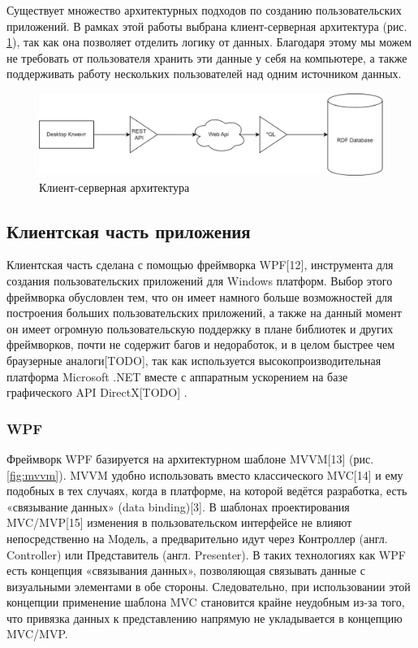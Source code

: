 \documentclass[12pt]{article}
\begin{document}
Существует множество архитектурных подходов по созданию пользовательских приложений. В рамках этой работы выбрана клиент-серверная архитектура (рис. \ref{fig:client_server_arch}), так как она позволяет отделить логику от данных. Благодаря этому мы можем не требовать от пользователя хранить эти данные у себя на компьютере, а также поддерживать работу нескольких пользователей над одним источником данных.

\begin{figure}[!ht]
    \centering
    \includegraphics[width=1\textwidth]{_images/architecture.png}
    \caption{Клиент-серверная архитектура}
    \label{fig:client_server_arch}
\end{figure}

\subsection{Клиентская часть приложения}
\qquad Клиентская часть сделана с помощью фреймворка WPF[12], инструмента для создания пользовательских приложений для Windows платформ. Выбор этого фреймворка обусловлен тем, что он имеет намного больше возможностей для построения больших пользовательских приложений, а также на данный момент он имеет огромную пользовательскую поддержку в плане библиотек и других фреймворков, почти не содержит багов и недоработок, и в целом быстрее чем браузерные аналоги[TODO], так как используется высокопроизводительная платформа Microsoft .NET вместе с аппаратным ускорением на базе графического API DirectX[TODO] .\par

\subsubsection{WPF}
\qquad Фреймворк WPF базируется на архитектурном шаблоне MVVM[13] (рис. \ref{fig:mvvm}). MVVM удобно использовать вместо классического MVC[14] и ему подобных в тех случаях, когда в платформе, на которой ведётся разработка, есть «связывание данных» (data binding)[3]. В шаблонах проектирования MVC/MVP[15] изменения в пользовательском интерфейсе не влияют непосредственно на Mодель, а предварительно идут через Контроллер (англ. Controller) или Представитель (англ. Presenter). В таких технологиях как WPF есть концепция «связывания данных», позволяющая связывать данные с визуальными элементами в обе стороны. Следовательно, при использовании этой концепции применение шаблона MVC становится крайне неудобным из-за того, что привязка данных к представлению напрямую не укладывается в концепцию MVC/MVP.\par
\end{document}

